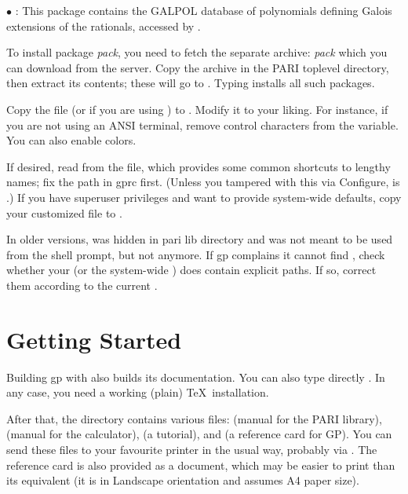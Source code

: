$\bullet$ : This package contains the GALPOL database of polynomials
defining Galois extensions of the rationals, accessed by .

\medskip

To install package \emph{pack}, you need to fetch the separate archive:
\emph{pack} which you can download from the  server.
Copy the archive in the PARI toplevel directory, then extract its
contents; these will go to . Typing  installs all such packages.

 Copy the file  (or
 if you are using ) to . Modify
it to your liking. For instance, if you are not using an ANSI terminal,
remove control characters from the  variable. You can also
enable colors.

If desired, read   from the 
file, which provides some common shortcuts to lengthy names; fix the path in
gprc first. (Unless you tampered with this via Configure,  is
.) If you have superuser privileges and want to
provide system-wide defaults, copy your customized  file to
.

In older versions,  was hidden in pari lib directory and was not
meant to be used from the shell prompt, but not anymore. If gp complains it
cannot find , check whether your  (or the system-wide
) does contain explicit paths. If so, correct them according to the
current .

\section{Getting Started}

 Building gp with  also builds
its documentation. You can also type directly . In any case,
you need a working (plain) \TeX\ installation.

After that, the  directory contains various  files:
 (manual for the PARI library),  (manual
for the  calculator),  (a tutorial), and
 (a reference card for GP). You can send these files to your
favourite printer in the usual way, probably via . The reference
card is also provided as a  document, which may be easier to
print than its  equivalent (it is in Landscape orientation and
assumes A4 paper size).

